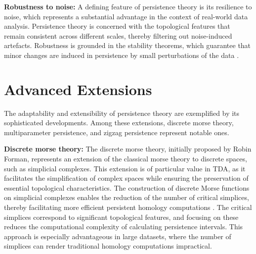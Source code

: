 \textbf{Robustness to noise:} A defining feature of persistence theory is its resilience to noise, which represents a substantial advantage in the context of real-world data analysis. Persistence theory is concerned with the topological features that remain consistent across different scales, thereby filtering out noise-induced artefacts. Robustness is grounded in the stability theorems, which guarantee that minor changes are induced in persistence by small perturbations of the data \cite[\S 3.1]{Cohen-Steiner2007}.

\section{Advanced Extensions}
The adaptability and extensibility of persistence theory are exemplified by its sophisticated developments. Among these extensions, discrete morse theory, multiparameter persistence, and zigzag persistence represent notable ones.

\textbf{Discrete morse theory:} The discrete morse theory, initially proposed by Robin Forman, represents an extension of the classical morse theory to discrete spaces, such as simplicial complexes. This extension is of particular value in TDA, as it facilitates the simplification of complex spaces while ensuring the preservation of essential topological characteristics. The construction of discrete Morse functions on simplicial complexes enables the reduction of the number of critical simplices, thereby facilitating more efficient persistent homology computations \cite{Forman2002}. The critical simplices correspond to significant topological features, and focusing on these reduces the computational complexity of calculating persistence intervals. This approach is especially advantageous in large datasets, where the number of simplices can render traditional homology computations impractical.

